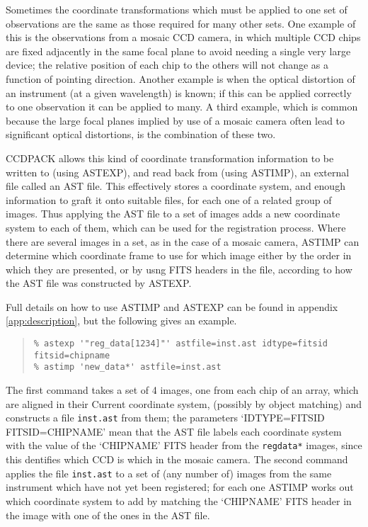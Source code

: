 \documentclass[twoside,11pt]{article}
\newcommand{\hyperref}[4]{#2\ref{#4}#3}
\renewcommand{\_}{\texttt{\symbol{95}}}
\newenvironment{myquote}{\begin{quote}\begin{small}}{\end{small}\end{quote}}
\newcommand{\text}[1]{{\small \tt #1}}
\newcommand{\routine}[1]{{\sc #1}}
\begin{document}
Sometimes the coordinate transformations which must be applied
to one set of observations are the same as those
required for many other sets.
One example of this is the observations from a mosaic
CCD camera, in which multiple CCD chips are fixed adjacently 
in the same focal plane to avoid needing a single very large device;
the relative position of each chip to the others 
will not change as a function of pointing direction.
Another example is when the optical distortion of an instrument
(at a given wavelength) is known; if this can be applied
correctly to one observation it can be applied to many.
A third example, which is common because the large focal planes
implied by use of a mosaic camera often lead to significant
optical distortions, is the combination of these two.

CCDPACK allows this kind of coordinate transformation information to 
be written to (using \routine{ASTEXP}), 
and read back from (using \routine{ASTIMP}),
an external file called an AST file.
This effectively stores a coordinate system, and enough information
to graft it onto suitable files, for each one of a related group
of images.
Thus applying the AST file to a set of images adds a new 
coordinate system to
each of them, which can be used for the registration process.
Where there are several images in a set, as in the case of 
a mosaic camera, \routine{ASTIMP} can determine which coordinate frame to
use for which image either by the order in which they are presented,
or by usng FITS headers in the file, 
according to how the AST file was constructed by \routine{ASTEXP}.

Full details on how to use \routine{ASTIMP} and \routine{ASTEXP}
can be found in \hyperref{an appendix}{appendix }{}{app:description},
but the following gives an example.
\begin{myquote}
\begin{verbatim}
% astexp '"reg_data[1234]"' astfile=inst.ast idtype=fitsid fitsid=chipname
% astimp 'new_data*' astfile=inst.ast
\end{verbatim}
\end{myquote}
The first command takes a set of 4 images, one from each chip of an array,
which are aligned in their Current coordinate system, 
(possibly by object matching)
and constructs a file \text{inst.ast} from them;
the parameters `IDTYPE=FITSID FITSID=CHIPNAME' 
mean that the AST file labels each coordinate system with the
value of the `CHIPNAME' FITS header from the \text{reg\_data*} images,
since this dentifies which CCD is which in the mosaic camera.
The second command applies the file \text{inst.ast}
to a set of (any number of) images from the same 
instrument which have not yet been registered;
for each one \routine{ASTIMP} works out which coordinate system to 
add by matching the `CHIPNAME' FITS header in the image with one of 
the ones in the AST file.
\end{document}
